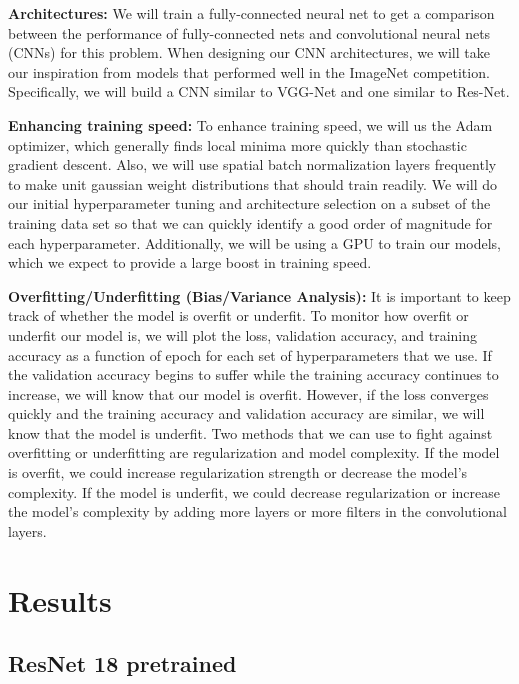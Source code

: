 \documentclass[10pt,twocolumn,letterpaper]{article}
\begin{document}
\textbf{Architectures:} We will train a fully-connected neural net to get a comparison between the performance of fully-connected nets and convolutional neural nets (CNNs) for this problem. When designing our CNN architectures, we will take our inspiration from models that performed well in the ImageNet competition. Specifically, we will build a CNN similar to VGG-Net\cite{VGGNet} and one similar to Res-Net\cite{ResNet}.

\textbf{Enhancing training speed:} To enhance training speed, we will us the Adam optimizer\cite{Adam}, which generally finds local minima more quickly than stochastic gradient descent. Also, we will use spatial batch normalization layers frequently to make unit gaussian weight distributions that should train readily. We will do our initial hyperparameter tuning and architecture selection on a subset of the training data set so that we can quickly identify a good order of magnitude for each hyperparameter. Additionally, we will be using a GPU to train our models, which we expect to provide a large boost in training speed.

\textbf{Overfitting/Underfitting (Bias/Variance Analysis):} It is important to keep track of whether the model is overfit or underfit. To monitor how overfit or underfit our model is, we will plot the loss, validation accuracy, and training accuracy as a function of epoch for each set of hyperparameters that we use. If the validation accuracy begins to suffer while the training accuracy continues to increase, we will know that our model is overfit. However, if the loss converges quickly and the training accuracy and validation accuracy are similar, we will know that the model is underfit. Two methods that we can use to fight against overfitting or underfitting are regularization and model complexity. If the model is overfit, we could increase regularization strength or decrease the model's complexity. If the model is underfit, we could decrease regularization or increase the model's complexity by adding more layers or more filters in the convolutional layers.




\section{Results}
\subsection*{ResNet 18 pretrained}
\end{document}
